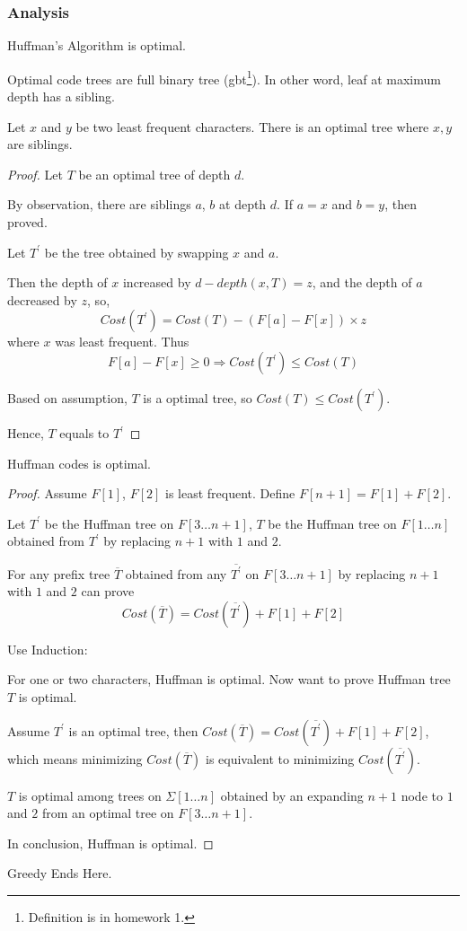 \subsubsection{Analysis}

\begin{claim}
    Huffman's Algorithm is optimal.
\end{claim}

\observation Optimal code trees are full binary tree (gbt\footnote{Definition is in homework 1.}).
In other word, leaf at maximum depth has a sibling.

\begin{lemma}
    Let $x$ and $y$ be two least frequent characters. There is an optimal tree
    where $x,y$ are siblings.
\end{lemma}

\begin{proof} Let $T$ be an optimal tree of depth $d$.

By observation, there are siblings $a$, $b$ at depth $d$.
If $a = x$ and $b = y$, then proved.

Let $T^\prime$ be the tree obtained by swapping $x$ and $a$.

Then the depth of $x$ increased by $d - depth(x,T) = z$, and
the depth of $a$ decreased by $z$, so,
\[Cost(T^\prime) = Cost(T) - (F[a]-F[x])\times z\]
where $x$ was least frequent. Thus
\[F[a] -F[x] \geq 0 \Rightarrow Cost(T^\prime) \leq Cost(T)\]

Based on assumption, $T$ is a optimal tree, so $Cost(T) \leq Cost(T^\prime)$.

Hence, $T$ equals to $T^\prime$
\end{proof}

\begin{theorem}
Huffman codes is optimal.
\end{theorem}

\begin{proof}
Assume $F[1]$, $F[2]$ is least frequent. Define $F[n+1] = F[1] + F[2]$.

Let $T^\prime$ be the Huffman tree on $F[3 \ldots n+1]$,
$T$ be the Huffman tree on $F[1 \ldots n]$ obtained from $T^\prime$ by
replacing $n+1$ with $1$ and $2$.

For any prefix tree $\overline{T}$ obtained from any $\overline{T^\prime}$
on $F[3 \ldots n+1]$ by replacing $n+1$ with $1$ and $2$ can prove
\[Cost(\overline{T}) = Cost(\overline{T^\prime}) + F[1] + F[2]\]

\noindent Use Induction:

\BaseCase For one or two characters, Huffman is optimal.
Now want to prove Huffman tree $T$ is optimal.

\InductionStep Assume $T^\prime$ is an optimal tree, then
$Cost(\overline{T}) = Cost(\overline{T^\prime}) + F[1] + F[2]$,
which means minimizing $Cost(\overline{T})$ is equivalent
to minimizing $Cost(\overline{T^\prime})$.

$T$ is optimal among trees on $\Sigma[1 \ldots n]$ obtained by an expanding $n+1$
node to $1$ and $2$ from an optimal tree on $F[3 \ldots n+1]$.

In conclusion, Huffman is optimal.
\end{proof}

Greedy Ends Here.
